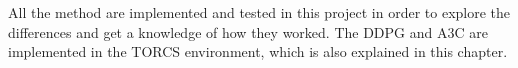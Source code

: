 All the method are implemented and tested in this project in order to explore the differences and get a knowledge of how they worked. The DDPG and A3C are implemented in the TORCS environment, which is also explained in this chapter.








